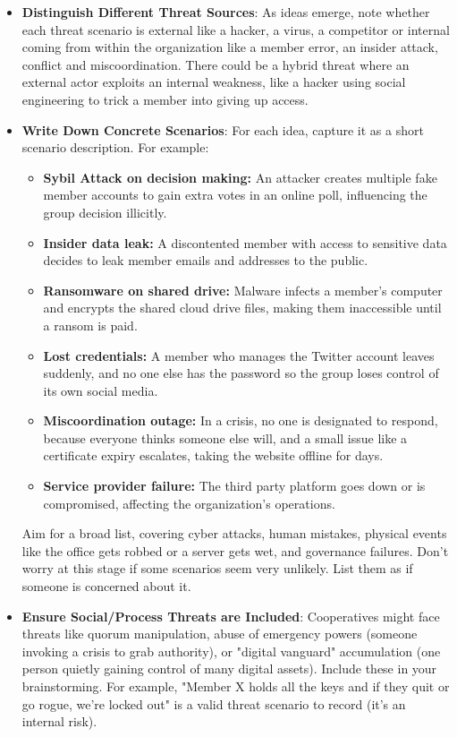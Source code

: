 \begin{itemize}
    \item \textbf{Distinguish Different Threat Sources}:
    As ideas emerge, note whether each threat scenario is external like a
    hacker, a virus, a competitor or internal coming from within the organization
    like a member error, an insider attack, conflict and miscoordination. There could
    be a hybrid threat where an external actor exploits an internal weakness, like
    a hacker using social engineering to trick a member into giving up access.

    \item \textbf{Write Down Concrete Scenarios}:
    For each idea, capture it as a short scenario description.
    For example:

    \begin{itemize}
        \item \textbf{Sybil Attack on decision making:} An attacker creates multiple fake member
        accounts to gain extra votes in an online poll, influencing the group decision illicitly.
        \item \textbf{Insider data leak:} A discontented member with access to sensitive data decides
        to leak member emails and addresses to the public.
        \item \textbf{Ransomware on shared drive:} Malware infects a member's computer and encrypts the
        shared cloud drive files, making them inaccessible until a ransom is paid.
        \item \textbf{Lost credentials:} A member who manages the Twitter account leaves suddenly, and
        no one else has the password so the group loses control of its own social media.
        \item \textbf{Miscoordination outage:} In a crisis, no one is designated to respond, because everyone
        thinks someone else will, and a small issue like a certificate expiry escalates, taking the website
        offline for days.
        \item \textbf{Service provider failure:} The third party platform goes
        down or is compromised, affecting the organization's operations.
    \end{itemize}

    Aim for a broad list, covering cyber attacks, human mistakes, physical events
    like the office gets robbed or a server gets wet, and governance failures. Don't
    worry at this stage if some scenarios seem very unlikely. List them as if someone
    is concerned about it.

    \item \textbf{Ensure Social/Process Threats are Included}:
    Cooperatives might face threats like quorum manipulation, abuse of emergency powers
    (someone invoking a crisis to grab authority), or "digital vanguard" accumulation (one person
    quietly gaining control of many digital assets). Include these in
    your brainstorming. For example, "Member X holds all the keys and if they quit
    or go rogue, we're locked out" is a valid threat scenario to record (it's an
    internal risk).

\end{itemize}


